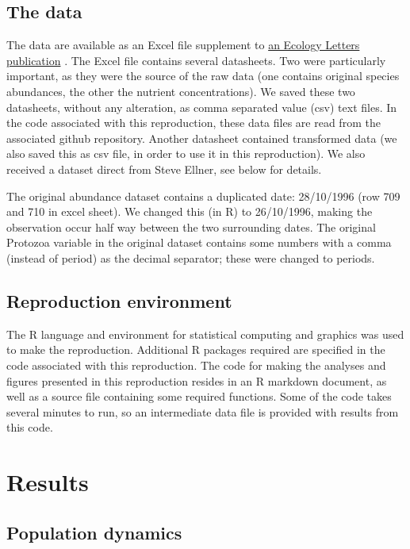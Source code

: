 \documentclass[10pt,a4paper,onecolumn]{article}
\begin{document}
\subsection{The data}\label{the-data}

The data are available as an Excel file supplement to
\href{http://onlinelibrary.wiley.com/doi/10.1111/j.1461-0248.2009.01391.x/abstract}{an
Ecology Letters publication} \textcite{Beninca2009}. The Excel file
contains several datasheets. Two were particularly important, as they
were the source of the raw data (one contains original species
abundances, the other the nutrient concentrations). We saved these two
datasheets, without any alteration, as comma separated value (csv) text
files. In the code associated with this reproduction, these data files
are read from the associated github repository. Another datasheet
contained transformed data (we also saved this as csv file, in order to
use it in this reproduction). We also received a dataset direct from
Steve Ellner, see below for details.

The original abundance dataset contains a duplicated date: 28/10/1996
(row 709 and 710 in excel sheet). We changed this (in R) to 26/10/1996,
making the observation occur half way between the two surrounding dates.
The original Protozoa variable in the original dataset contains some
numbers with a comma (instead of period) as the decimal separator; these
were changed to periods.

\subsection{Reproduction environment}\label{reproduction-environment}

The R language and environment for statistical computing and graphics
was used to make the reproduction. Additional R packages required are
specified in the code associated with this reproduction. The code for
making the analyses and figures presented in this reproduction resides
in an R markdown document, as well as a source file containing some
required functions. Some of the code takes several minutes to run, so an
intermediate data file is provided with results from this code.

\section{Results}\label{results}

\subsection{Population dynamics}\label{population-dynamics}
\end{document}
